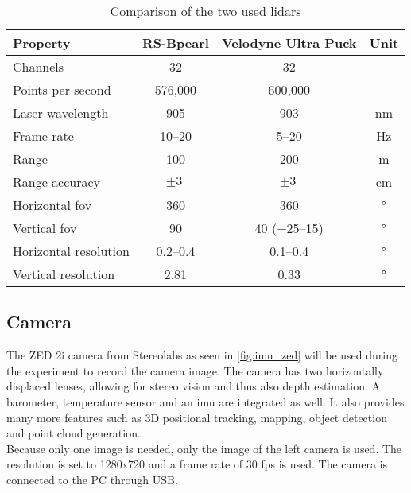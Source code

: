 \begin{table}[ht]
	\centering
	\caption{Comparison of the two used \acrshort{lidar}s \cite{RoboSense2020, Velodyne2018}}
	\label{tab:lidar_datasheets}
	\begin{tabular}[t]{lccc}
		\toprule
		\textbf{Property}     & \textbf{RS-Bpearl}   & \textbf{Velodyne Ultra Puck}    & \textbf{Unit}     \\
		\midrule
		Channels              & 32                   & 32                              &                   \\
		Points per second     & 576,000              & 600,000                         & \si{}             \\
		Laser wavelength      & \SI{905}{}           & \SI{903}{}                      & \si{\nano\metre}  \\
		Frame rate            & \SIrange{10}{20}{}   & \SIrange{5}{20}{}               & \si{\hertz}       \\
		Range                 & \SI{100}{}           & \SI{200}{}                      & \si{\metre}       \\
		Range accuracy        & $\pm\SI{3}{}$        & $\pm\SI{3}{}$                   & \si{\centi\metre} \\
		Horizontal \gls{fov}  & \SI{360}{}           & \SI{360}{}                      & \si{\degree}      \\
		Vertical \gls{fov}    & \SI{90}{}            & \SI{40}{} (\SIrange{-25}{15}{}) & \si{\degree}      \\
		Horizontal resolution & \SIrange{0.2}{0.4}{} & \SIrange{0.1}{0.4}{}            & \si{\degree}      \\
		Vertical resolution   & \SI{2.81}{}          & \SI{0.33}{}                     & \si{\degree}      \\
		\bottomrule
	\end{tabular}
\end{table}


\subsection{Camera}
\label{ssec:camera}
The ZED 2i camera from Stereolabs as seen in \cref{fig:imu_zed} will be used during the experiment to record the camera image.
The camera has two horizontally displaced lenses, allowing for stereo vision and thus also depth estimation.
A barometer, temperature sensor and an \gls{imu} are integrated as well.
It also provides many more features such as 3D positional tracking, mapping, object detection and point cloud generation.\\
Because only one image is needed, only the image of the left camera is used.
The resolution is set to 1280x720 and a frame rate of 30 \gls{fps} is used.
The camera is connected to the PC through USB.



